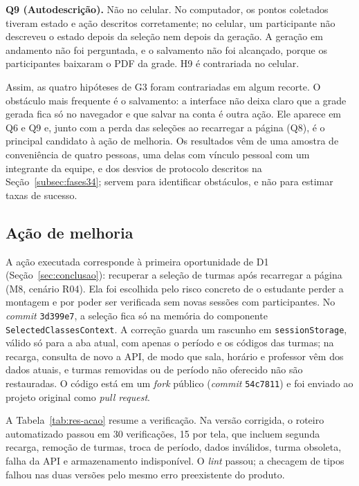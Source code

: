 \documentclass[12pt]{article}
\begin{document}
\textbf{Q9 (Autodescrição).} Não no celular. No computador, os pontos coletados
tiveram estado e ação descritos corretamente; no celular, um participante não
descreveu o estado depois da seleção nem depois da geração. A geração em
andamento não foi perguntada, e o salvamento não foi alcançado, porque os
participantes baixaram o PDF da grade. H9 é contrariada no celular.

Assim, as quatro hipóteses de G3 foram contrariadas em algum recorte. O obstáculo
mais frequente é o salvamento: a interface não deixa claro que a grade gerada
fica só no navegador e que salvar na conta é outra ação. Ele aparece em Q6 e Q9
e, junto com a perda das seleções ao recarregar a página (Q8), é o principal
candidato à ação de melhoria. Os resultados vêm de uma amostra de conveniência de
quatro pessoas, uma delas com vínculo pessoal com um integrante da equipe, e dos
desvios de protocolo descritos na Seção~\ref{subsec:fases34}; servem para
identificar obstáculos, e não para estimar taxas de sucesso.

\subsection{Ação de melhoria}\label{subsec:res-acao}

A ação executada corresponde à primeira oportunidade de D1
(Seção~\ref{sec:conclusao}): recuperar a seleção de turmas após recarregar a
página (M8, cenário R04). Ela foi escolhida pelo risco concreto de o estudante
perder a montagem e por poder ser verificada sem novas sessões com
participantes. No \textit{commit} \texttt{3d399e7}, a seleção fica só na memória
do componente \texttt{SelectedClassesContext}. A correção guarda um rascunho em
\texttt{sessionStorage}, válido só para a aba atual, com apenas o período e os
códigos das turmas; na recarga, consulta de novo a API, de modo que sala, horário
e professor vêm dos dados atuais, e turmas removidas ou de período não oferecido
não são restauradas. O código está em um \textit{fork} público (\textit{commit}
\texttt{54c7811}) e foi enviado ao projeto original como \textit{pull request}.

A Tabela~\ref{tab:res-acao} resume a verificação. Na versão corrigida, o roteiro
automatizado passou em 30 verificações, 15 por tela, que incluem segunda recarga,
remoção de turmas, troca de período, dados inválidos, turma obsoleta, falha da
API e armazenamento indisponível. O \textit{lint} passou; a checagem de tipos
falhou nas duas versões pelo mesmo erro preexistente do produto.
\end{document}
